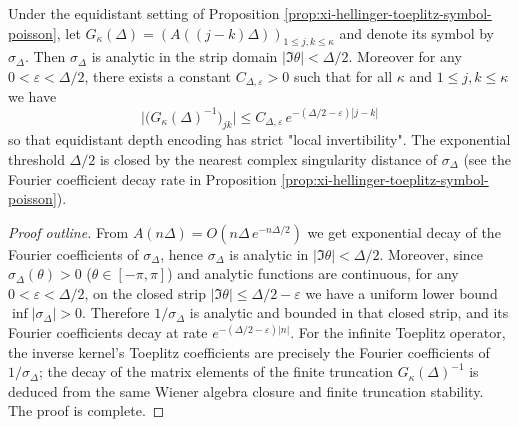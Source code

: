 \begin{proposition}\label{prop:xi-hellinger-toeplitz-inverse-localization}
Under the equidistant setting of Proposition \ref{prop:xi-hellinger-toeplitz-symbol-poisson}, let
\(
G_\kappa(\Delta)=(A((j-k)\Delta))_{1\le j,k\le \kappa}
\)
and denote its symbol by \(\sigma_\Delta\).
Then \(\sigma_\Delta\) is analytic in the strip domain \(|\Im\theta|<\Delta/2\).
Moreover for any \(0<\varepsilon<\Delta/2\), there exists a constant \(C_{\Delta,\varepsilon}>0\) such that for all \(\kappa\) and \(1\le j,k\le\kappa\) we have
\[
\boxed{\;
\bigl|\bigl(G_\kappa(\Delta)^{-1}\bigr)_{jk}\bigr|
\le C_{\Delta,\varepsilon}\,e^{-(\Delta/2-\varepsilon)|j-k|}\;}
\]
so that equidistant depth encoding has strict "local invertibility".
The exponential threshold \(\Delta/2\) is closed by the nearest complex singularity distance of \(\sigma_\Delta\) (see the Fourier coefficient decay rate in Proposition \ref{prop:xi-hellinger-toeplitz-symbol-poisson}).
\end{proposition}
\begin{proof}[Proof outline]
From \(A(n\Delta)=O(n\Delta\,e^{-n\Delta/2})\) we get exponential decay of the Fourier coefficients of \(\sigma_\Delta\), hence \(\sigma_\Delta\) is analytic in \(|\Im\theta|<\Delta/2\).
Moreover, since \(\sigma_\Delta(\theta)>0\) (\(\theta\in[-\pi,\pi]\)) and analytic functions are continuous, for any \(0<\varepsilon<\Delta/2\), on the closed strip \(|\Im\theta|\le \Delta/2-\varepsilon\) we have a uniform lower bound \(\inf|\sigma_\Delta|>0\).
Therefore \(1/\sigma_\Delta\) is analytic and bounded in that closed strip, and its Fourier coefficients decay at rate \(e^{-(\Delta/2-\varepsilon)|n|}\).
For the infinite Toeplitz operator, the inverse kernel's Toeplitz coefficients are precisely the Fourier coefficients of \(1/\sigma_\Delta\); the decay of the matrix elements of the finite truncation \(G_\kappa(\Delta)^{-1}\) is deduced from the same Wiener algebra closure and finite truncation stability. The proof is complete.
\end{proof}


